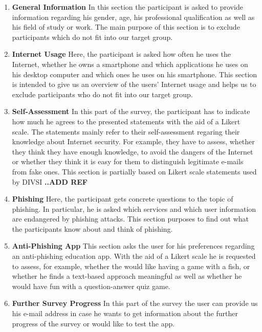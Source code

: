 \begin{enumerate}
	\item \textbf{General Information} In this section the participant is asked to provide information regarding his gender, age, his professional qualification as well as his field of study or work.
 The main purpose of this section is to exclude participants which do not fit into our target group.

	\item \textbf{Internet Usage} Here, the participant is asked how often he uses the Internet, whether he owns a smartphone and which applications he uses on his desktop computer and which ones he uses on his smartphone.
 This section is intended to give us an overview of the users' Internet usage and helps us to exclude participants who do not fit into our target group.

	\item \textbf{Self-Assessment} In this part of the survey, the participant has to indicate how much he agrees to the presented statements with the aid of a Likert scale.
 The statements mainly refer to their self-assessment regaring their knowledge about Internet security.
 For example, they have to assess, whether they think they have enough knowledge, to avoid the dangers of the Internet or whether they think it is easy for them to distinguish legitimate e-mails from fake ones.
 This section is partially based on Likert scale statements used by DIVSI \textbf{..ADD REF}
	\item \textbf{Phishing} Here, the participant gets concrete questions to the topic of phishing.
 In particular, he is asked which services and which user information are endangered by phishing attacks.
 This section purposes to find out what the participants know about and think of phishing.

	\item \textbf{Anti-Phishing App} This section asks the user for his preferences regarding an anti-phishing education app.
 With the aid of a Likert scale he is requested to assess, for example, whether the would like having a game with a fish, or whether he finds a text-based approach meaningful as well as whether he would have fun with a question-answer quiz game.

	\item \textbf{Further Survey Progress} In this part of the survey the user can provide us his e-mail address in case he wants to get information about the further progress of the survey or would like to test the app.

\end{enumerate}

